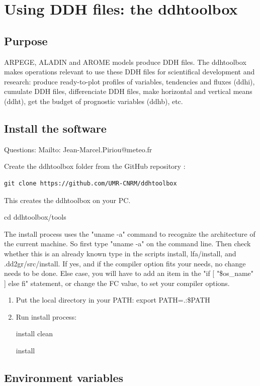\chapter{Using DDH files: the ddhtoolbox}

\section{Purpose}

\p ARPEGE, ALADIN and AROME models produce DDH files. The ddhtoolbox makes operations relevant to use these DDH files for scientifical development and research: produce ready-to-plot profiles of variables, tendencies and fluxes (ddhi), cumulate DDH files, differenciate DDH files, make horizontal and vertical means (ddht), get the budget of prognostic variables (ddhb), etc.

\section{Install the software}

\p Questions: Mailto: Jean-Marcel.Piriou@meteo.fr

\p Create the ddhtoolbox folder from the GitHub repository :
{\small \begin{verbatim} 
git clone https://github.com/UMR-CNRM/ddhtoolbox
\end{verbatim}}
\noi This creates the ddhtoolbox on your PC.

\p cd ddhtoolbox/tools

\p The install process uses the "uname -a" command to recognize the architecture of the  current  machine.  So first type "uname -a" on the command line. Then check whether  this  is an already known type in the scripts install, lfa/install, and .dd2gr/src/install.  If  yes, and if the compiler option fits your needs, no change needs to be done.  Else  case,  you  will  have  to  add an item in the "if [ "\$os\_name" ] else fi" statement, or change the FC value, to set your compiler options.

\begin{enumerate}
  \item Put the local directory in your PATH:
    export PATH=.:\$PATH
  \item Run install process: 

    install clean

    install
\end{enumerate}

\section{Environment variables}

